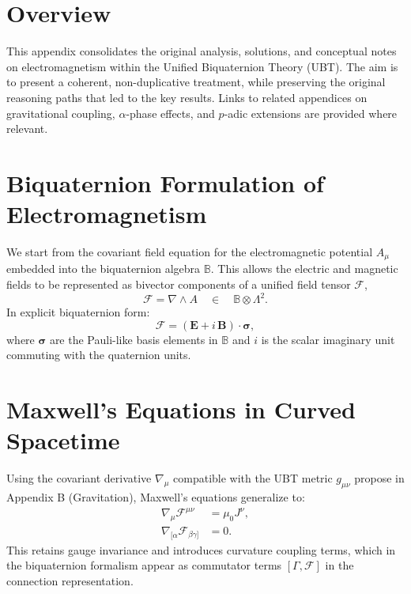 

\section{Overview}
This appendix consolidates the original analysis, solutions, and conceptual notes on electromagnetism within the Unified Biquaternion Theory (UBT). The aim is to present a coherent, non-duplicative treatment, while preserving the original reasoning paths that led to the key results. Links to related appendices on gravitational coupling, $\alpha$-phase effects, and $p$-adic extensions are provided where relevant.

\section{Biquaternion Formulation of Electromagnetism}
We start from the covariant field equation for the electromagnetic potential $A_\mu$ embedded into the biquaternion algebra $\mathbb{B}$. This allows the electric and magnetic fields to be represented as bivector components of a unified field tensor $\mathcal{F}$,
\begin{equation}
    \mathcal{F} = \nabla \wedge A \quad \in \quad \mathbb{B} \otimes \Lambda^2.
\end{equation}
In explicit biquaternion form:
\begin{equation}
    \mathcal{F} = (\mathbf{E} + i\,\mathbf{B}) \cdot \boldsymbol{\sigma},
\end{equation}
where $\boldsymbol{\sigma}$ are the Pauli-like basis elements in $\mathbb{B}$ and $i$ is the scalar imaginary unit commuting with the quaternion units.

\section{Maxwell's Equations in Curved Spacetime}
Using the covariant derivative $\nabla_\mu$ compatible with the UBT metric $g_{\mu\nu}$ propose in Appendix B (Gravitation), Maxwell's equations generalize to:
\begin{align}
    \nabla_\mu \mathcal{F}^{\mu\nu} &= \mu_0 J^\nu, \\
    \nabla_{[\alpha} \mathcal{F}_{\beta\gamma]} &= 0.
\end{align}
This retains gauge invariance and introduces curvature coupling terms, which in the biquaternion formalism appear as commutator terms $[\Gamma, \mathcal{F}]$ in the connection representation.

